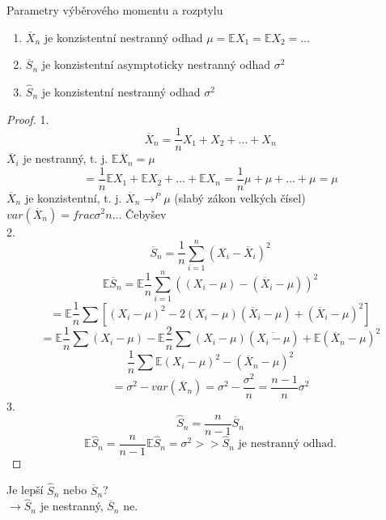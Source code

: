 \documentclass[../main.tex]{subfiles}
\begin{document}
\begin{theorem}
    Parametry výběrového momentu a rozptylu\\

    \begin{enumerate}
        \item $\overline{X}_n$ je konzistentní nestranný odhad $\mu = \mathbb{E}X_1 = \mathbb{E}X_2 =\dots$
        \item $\overline{S}_n$ je konzistentní asymptoticky nestranný odhad $\sigma^2$
        \item $\widehat{S}_n$ je konzistentní nestranný odhad $\sigma^2$
    \end{enumerate}
    \begin{proof}
        1. 
        \[\overline{X}_n = \frac{1}{n} X_1 + X_2 + \dots + X_n\]
        $\overline{X}_i$ je nestranný, t. j. $\mathbb{E}\overline{X}_n = \mu$
        \[ = \frac{1}{n} \mathbb{E}X_1 + \mathbb{E}X_2 + \dots + \mathbb{E}X_n = \frac{1}{n} \mu + \mu + \dots + \mu = \mu\]
        $\overline{X}_n$ je konzistentní, t. j. $\overline{X}_n \rightarrow^P \mu$ (slabý zákon velkých čísel) \\
        $var(\overline{X}_n) = frac{\sigma^2}{n} \dots$ Čebyšev\\
        2. 
        \[\overline{S}_n = \frac{1}{n} \sum^n_{i=1}(X_i - \overline{X}_i)^2\]
        \[\mathbb{E}\overline{S}_n = \mathbb{E}\frac{1}{n}\sum^n_{i=1}((X_i - \mu) - (\overline{X}_i - \mu))^2\]
        \[ = \mathbb{E}\frac{1}{n}\sum\left[(X_i - \mu)^2 - 2(X_i - \mu)(\overline{X}_i-\mu) + (\overline{X}_i - \mu)^2\right]\]
        \[ = \mathbb{E}\frac{1}{n}\sum(X_i - \mu) - \mathbb{E} \frac{2}{n} \sum (X_i - \mu)(\overline{X_i-\mu}) + \mathbb{E}(\overline{X}_n - \mu)^2\]
        \[ \frac{1}{n} \sum \mathbb{E}(X_i - \mu)^2 - \mathbb{} (\overline{X}_n - \mu)^2\]
        \[ = \sigma^2 - var(\overline{X}_n) = \sigma^2 - \frac{\sigma^2}{n} = \frac{n-1}{n}\sigma^2\]
        3. 
        \[\widehat{S}_n = \frac{n}{n-1}\overline{S}_n\]
        \[\mathbb{E}\widehat{S}_n = \frac{n}{n-1}\mathbb{E}\widehat{S}_n = \sigma^2 >> \widehat{S}_n \text{ je nestranný odhad.}\]
    \end{proof}
\end{theorem}
Je lepší $\widehat{S}_n$ nebo $\overline{S}_n$?\\
$\rightarrow \widehat{S}_n$ je nestranný, $\overline{S}_n$ ne.\\
\end{document}

